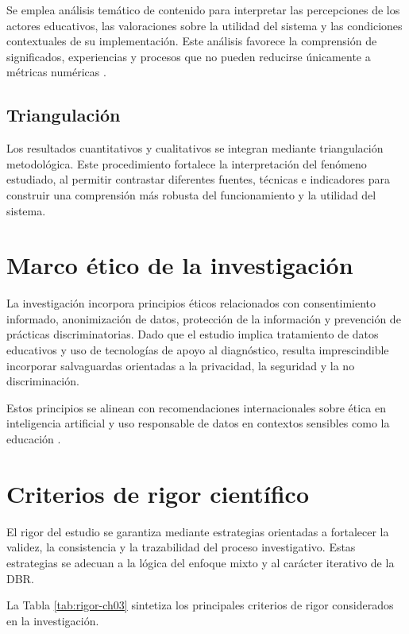 \begin{refsection}
Se emplea análisis temático de contenido para interpretar las percepciones de los actores educativos, las valoraciones sobre la utilidad del sistema y las condiciones contextuales de su implementación. Este análisis favorece la comprensión de significados, experiencias y procesos que no pueden reducirse únicamente a métricas numéricas \parencite{patton2015,maxwell2013}.

\subsection{Triangulación}

Los resultados cuantitativos y cualitativos se integran mediante triangulación metodológica. Este procedimiento fortalece la interpretación del fenómeno estudiado, al permitir contrastar diferentes fuentes, técnicas e indicadores para construir una comprensión más robusta del funcionamiento y la utilidad del sistema.

\section{Marco ético de la investigación}

La investigación incorpora principios éticos relacionados con consentimiento informado, anonimización de datos, protección de la información y prevención de prácticas discriminatorias. Dado que el estudio implica tratamiento de datos educativos y uso de tecnologías de apoyo al diagnóstico, resulta imprescindible incorporar salvaguardas orientadas a la privacidad, la seguridad y la no discriminación.

Estos principios se alinean con recomendaciones internacionales sobre ética en inteligencia artificial y uso responsable de datos en contextos sensibles como la educación \parencite{unesco2021}.

\section{Criterios de rigor científico}

El rigor del estudio se garantiza mediante estrategias orientadas a fortalecer la validez, la consistencia y la trazabilidad del proceso investigativo. Estas estrategias se adecuan a la lógica del enfoque mixto y al carácter iterativo de la DBR.

La Tabla \ref{tab:rigor-ch03} sintetiza los principales criterios de rigor considerados en la investigación.


\end{refsection}

